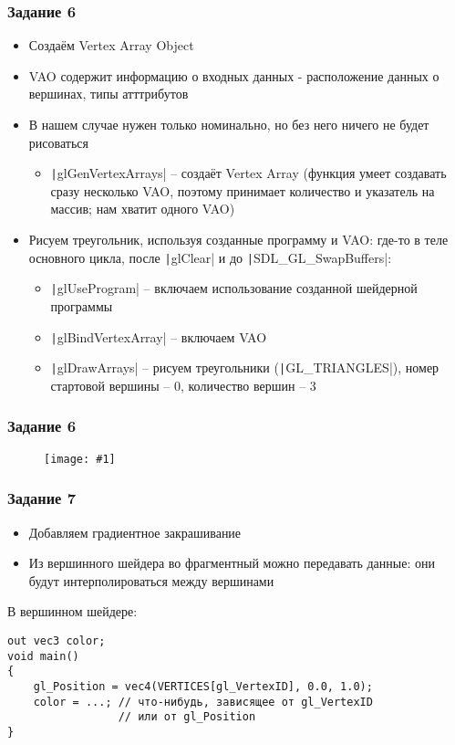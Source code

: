 \documentclass[10pt]{beamer}
\newcommand{\slideimage}[1]{
  \begin{figure}
    \begin{adjustbox}{width=\textwidth, totalheight=\textheight-2\baselineskip-2\baselineskip,keepaspectratio}
      \texttt{[image: \#1]}
    \end{adjustbox}
  \end{figure}
}
\begin{document}
\begin{frame}[fragile]
\frametitle{Задание 6}
\begin{itemize}
\item Создаём Vertex Array Object
\item VAO содержит информацию о входных данных - расположение данных о вершинах, типы атттрибутов
\item В нашем случае нужен только номинально, но без него ничего не будет рисоваться
\begin{itemize}
\item \texttt|glGenVertexArrays| -- создаёт Vertex Array (функция умеет создавать сразу несколько VAO, поэтому принимает количество и указатель на массив; нам хватит одного VAO)
\end{itemize}
\item Рисуем треугольник, используя созданные программу и VAO: где-то в теле основного цикла, после \texttt|glClear| и до \texttt|SDL_GL_SwapBuffers|:
\begin{itemize}
\item \texttt|glUseProgram| -- включаем использование созданной шейдерной программы
\item \texttt|glBindVertexArray| -- включаем VAO
\item \texttt|glDrawArrays| -- рисуем треугольники (\texttt|GL_TRIANGLES|), номер стартовой вершины -- 0, количество вершин -- 3
\end{itemize}
\end{itemize}
\end{frame}

\begin{frame}[fragile]
\frametitle{Задание 6}
\slideimage{task_6.png}
\end{frame}

\begin{frame}[fragile]
\frametitle{Задание 7}
\begin{itemize}
\item Добавляем градиентное закрашивание
\item Из вершинного шейдера во фрагментный можно передавать данные: они будут интерполироваться между вершинами
\end{itemize}
В вершинном шейдере:
\begin{verbatim}
out vec3 color;
void main()
{
    gl_Position = vec4(VERTICES[gl_VertexID], 0.0, 1.0);
    color = ...; // что-нибудь, зависящее от gl_VertexID 
                 // или от gl_Position
}
\end{verbatim}
\end{frame}
\end{document}
